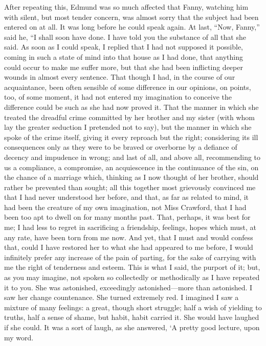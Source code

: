 After repeating this, Edmund was so much affected that Fanny,
watching him with silent, but most tender concern,
was almost sorry that the subject had been entered
on at all.  It was long before he could speak again.
At last, ``Now, Fanny,'' said he, ``I shall soon have done.
I have told you the substance of all that she said.
As soon as I could speak, I replied that I had not
supposed it possible, coming in such a state of mind
into that house as I had done, that anything could
occur to make me suffer more, but that she had been
inflicting deeper wounds in almost every sentence.
That though I had, in the course of our acquaintance,
been often sensible of some difference in our opinions,
on points, too, of some moment, it had not entered my
imagination to conceive the difference could be such as she
had now proved it.  That the manner in which she treated
the dreadful crime committed by her brother and my sister
(with whom lay the greater seduction I pretended not to say),
but the manner in which she spoke of the crime itself,
giving it every reproach but the right; considering its ill
consequences only as they were to be braved or overborne
by a defiance of decency and impudence in wrong; and last
of all, and above all, recommending to us a compliance,
a compromise, an acquiescence in the continuance of the sin,
on the chance of a marriage which, thinking as I now thought
of her brother, should rather be prevented than sought;
all this together most grievously convinced me that I had
never understood her before, and that, as far as related
to mind, it had been the creature of my own imagination,
not Miss Crawford, that I had been too apt to dwell on
for many months past.  That, perhaps, it was best for me;
I had less to regret in sacrificing a friendship, feelings,
hopes which must, at any rate, have been torn from me now.
And yet, that I must and would confess that, could I
have restored her to what she had appeared to me before,
I would infinitely prefer any increase of the pain
of parting, for the sake of carrying with me the right of
tenderness and esteem.  This is what I said, the purport
of it; but, as you may imagine, not spoken so collectedly
or methodically as I have repeated it to you.  She was
astonished, exceedingly astonished---more than astonished.
I saw her change countenance.  She turned extremely red.
I imagined I saw a mixture of many feelings:  a great,
though short struggle; half a wish of yielding to truths,
half a sense of shame, but habit, habit carried it.
She would have laughed if she could.  It was a sort of laugh,
as she answered, `A pretty good lecture, upon my word.

